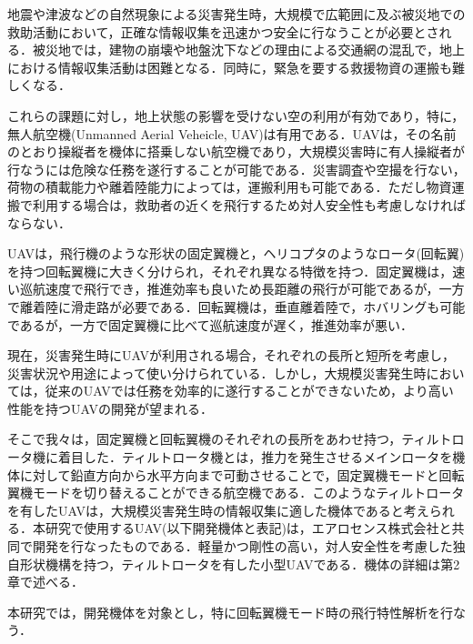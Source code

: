 
地震や津波などの自然現象による災害発生時，大規模で広範囲に及ぶ被災地での救助活動において，正確な情報収集を迅速かつ安全に行なうことが必要とされる．被災地では，建物の崩壊や地盤沈下などの理由による交通網の混乱で，地上における情報収集活動は困難となる．同時に，緊急を要する救援物資の運搬も難しくなる．

これらの課題に対し，地上状態の影響を受けない空の利用が有効であり，特に，無人航空機(Unmanned Aerial Veheicle, UAV)は有用である．UAVは，その名前のとおり操縦者を機体に搭乗しない航空機であり，大規模災害時に有人操縦者が行なうには危険な任務を遂行することが可能である．災害調査や空撮を行ない，荷物の積載能力や離着陸能力によっては，運搬利用も可能である．ただし物資運搬で利用する場合は，救助者の近くを飛行するため対人安全性も考慮しなければならない．

UAVは，飛行機のような形状の固定翼機と，ヘリコプタのようなロータ(回転翼)を持つ回転翼機に大きく分けられ，それぞれ異なる特徴を持つ．固定翼機は，速い巡航速度で飛行でき，推進効率も良いため長距離の飛行が可能であるが，一方で離着陸に滑走路が必要である．回転翼機は，垂直離着陸で，ホバリングも可能であるが，一方で固定翼機に比べて巡航速度が遅く，推進効率が悪い．

現在，災害発生時にUAVが利用される場合，それぞれの長所と短所を考慮し，災害状況や用途によって使い分けられている．しかし，大規模災害発生時においては，従来のUAVでは任務を効率的に遂行することができないため，より高い性能を持つUAVの開発が望まれる．

そこで我々は，固定翼機と回転翼機のそれぞれの長所をあわせ持つ，ティルトロータ機に着目した．ティルトロータ機とは，推力を発生させるメインロータを機体に対して鉛直方向から水平方向まで可動させることで，固定翼機モードと回転翼機モードを切り替えることができる航空機である．このようなティルトロータを有したUAVは，大規模災害発生時の情報収集に適した機体であると考えられる．本研究で使用するUAV(以下開発機体と表記)は，エアロセンス株式会社と共同で開発を行なったものである．軽量かつ剛性の高い，対人安全性を考慮した独自形状機構を持つ，ティルトロータを有した小型UAVである．機体の詳細は第2章で述べる．

本研究では，開発機体を対象とし，特に回転翼機モード時の飛行特性解析を行なう．
